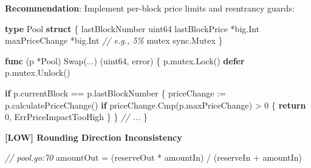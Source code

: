 \documentclass[
]{article}
\newenvironment{Shaded}{}{}
\newcommand{\CommentTok}[1]{\textcolor[rgb]{0.38,0.63,0.69}{\textit{#1}}}
\newcommand{\ControlFlowTok}[1]{\textcolor[rgb]{0.00,0.44,0.13}{\textbf{#1}}}
\newcommand{\DataTypeTok}[1]{\textcolor[rgb]{0.56,0.13,0.00}{#1}}
\newcommand{\DecValTok}[1]{\textcolor[rgb]{0.25,0.63,0.44}{#1}}
\newcommand{\KeywordTok}[1]{\textcolor[rgb]{0.00,0.44,0.13}{\textbf{#1}}}
\newcommand{\NormalTok}[1]{#1}
\newcommand{\OperatorTok}[1]{\textcolor[rgb]{0.40,0.40,0.40}{#1}}
\begin{document}
\textbf{Recommendation}: Implement per-block price limits and reentrancy
guards:

\begin{Shaded}
\begin{Highlighting}[]
\KeywordTok{type}\NormalTok{ Pool }\KeywordTok{struct} \OperatorTok{\{}
\NormalTok{    lastBlockNumber }\DataTypeTok{uint64}
\NormalTok{    lastBlockPrice  }\OperatorTok{*}\NormalTok{big}\OperatorTok{.}\NormalTok{Int}
\NormalTok{    maxPriceChange  }\OperatorTok{*}\NormalTok{big}\OperatorTok{.}\NormalTok{Int }\CommentTok{// e.g., 5\%}
\NormalTok{    mutex           sync}\OperatorTok{.}\NormalTok{Mutex}
\OperatorTok{\}}

\KeywordTok{func} \OperatorTok{(}\NormalTok{p }\OperatorTok{*}\NormalTok{Pool}\OperatorTok{)}\NormalTok{ Swap}\OperatorTok{(...)} \OperatorTok{(}\DataTypeTok{uint64}\OperatorTok{,} \DataTypeTok{error}\OperatorTok{)} \OperatorTok{\{}
\NormalTok{    p}\OperatorTok{.}\NormalTok{mutex}\OperatorTok{.}\NormalTok{Lock}\OperatorTok{()}
    \ControlFlowTok{defer}\NormalTok{ p}\OperatorTok{.}\NormalTok{mutex}\OperatorTok{.}\NormalTok{Unlock}\OperatorTok{()}
    
    \ControlFlowTok{if}\NormalTok{ p}\OperatorTok{.}\NormalTok{currentBlock }\OperatorTok{==}\NormalTok{ p}\OperatorTok{.}\NormalTok{lastBlockNumber }\OperatorTok{\{}
\NormalTok{        priceChange }\OperatorTok{:=}\NormalTok{ p}\OperatorTok{.}\NormalTok{calculatePriceChange}\OperatorTok{()}
        \ControlFlowTok{if}\NormalTok{ priceChange}\OperatorTok{.}\NormalTok{Cmp}\OperatorTok{(}\NormalTok{p}\OperatorTok{.}\NormalTok{maxPriceChange}\OperatorTok{)} \OperatorTok{\textgreater{}} \DecValTok{0} \OperatorTok{\{}
            \ControlFlowTok{return} \DecValTok{0}\OperatorTok{,}\NormalTok{ ErrPriceImpactTooHigh}
        \OperatorTok{\}}
    \OperatorTok{\}}
    \CommentTok{// ...}
\OperatorTok{\}}
\end{Highlighting}
\end{Shaded}

\textbf{{[}LOW{]} Rounding Direction Inconsistency}

\begin{Shaded}
\begin{Highlighting}[]
\CommentTok{// pool.go:70}
\NormalTok{amountOut }\OperatorTok{=} \OperatorTok{(}\NormalTok{reserveOut }\OperatorTok{*}\NormalTok{ amountIn}\OperatorTok{)} \OperatorTok{/} \OperatorTok{(}\NormalTok{reserveIn }\OperatorTok{+}\NormalTok{ amountIn}\OperatorTok{)}
\end{Highlighting}
\end{Shaded}
\end{document}
